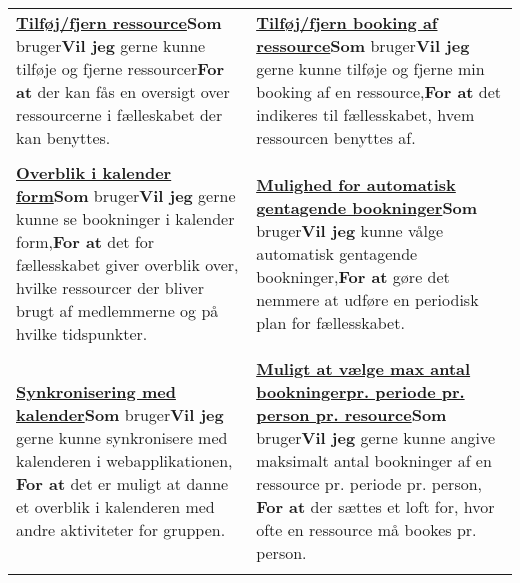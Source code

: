 \begin{tabular}{p{2.5in}p{2.5in}}
\textbf{\underline{Tilføj/fjern ressource}}\newline \textbf{Som} bruger\newline \textbf{Vil jeg} gerne kunne tilføje og fjerne ressourcer\newline \textbf{For at} der kan fås en oversigt over ressourcerne i fælleskabet der kan benyttes. & \textbf{\underline{Tilføj/fjern booking af ressource}}\newline \textbf{Som} bruger\newline \textbf{Vil jeg} gerne kunne tilføje og fjerne min booking af en ressource,\newline \textbf{For at} det indikeres til fællesskabet, hvem ressourcen benyttes af.  \\\\
\textbf{\underline{Overblik i kalender form}}\newline \textbf{Som} bruger\newline \textbf{Vil jeg} gerne kunne se bookninger i kalender form,\newline \textbf{For at} det for fællesskabet giver overblik over, hvilke ressourcer der bliver brugt af medlemmerne og på hvilke tidspunkter.  & \textbf{\underline{Mulighed for automatisk gentagende bookninger}}\newline \textbf{Som} bruger\newline \textbf{Vil jeg} kunne vålge automatisk gentagende bookninger,\newline \textbf{For at} gøre det nemmere at udføre en periodisk plan for fællesskabet.  \\\\  
\textbf{\underline{Synkronisering med kalender}}\newline \textbf{Som} bruger\newline \textbf{Vil jeg} gerne kunne synkronisere med kalenderen i webapplikationen, \newline \textbf{For at} det er muligt at danne et overblik i kalenderen med andre aktiviteter for gruppen.  & 
\textbf{\underline{Muligt at vælge max antal bookninger}}\newline \textbf{\underline{pr. periode pr. person pr. resource}}\newline \textbf{Som} bruger\newline \textbf{Vil jeg} gerne kunne angive maksimalt antal bookninger af en ressource pr. periode pr. person, \newline\textbf{For at} der sættes et loft for, hvor ofte en ressource må bookes pr. person.  \\\\

\end{tabular}
